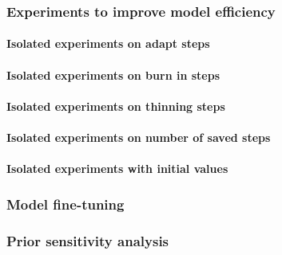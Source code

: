 \documentclass[12pt]{article}
\begin{document}
\hypertarget{experiments-to-improve-model-efficiency}{%
\subsubsection{Experiments to improve model
efficiency}\label{experiments-to-improve-model-efficiency}}

\hypertarget{isolated-experiments-on-adapt-steps}{%
\paragraph{Isolated experiments on adapt
steps}\label{isolated-experiments-on-adapt-steps}}

\hypertarget{isolated-experiments-on-burn-in-steps}{%
\paragraph{Isolated experiments on burn in
steps}\label{isolated-experiments-on-burn-in-steps}}

\hypertarget{isolated-experiments-on-thinning-steps}{%
\paragraph{Isolated experiments on thinning
steps}\label{isolated-experiments-on-thinning-steps}}

\hypertarget{isolated-experiments-on-number-of-saved-steps}{%
\paragraph{Isolated experiments on number of saved
steps}\label{isolated-experiments-on-number-of-saved-steps}}

\hypertarget{isolated-experiments-with-initial-values}{%
\paragraph{Isolated experiments with initial
values}\label{isolated-experiments-with-initial-values}}

\hypertarget{model-fine-tuning}{%
\subsubsection{Model fine-tuning}\label{model-fine-tuning}}

\hypertarget{prior-sensitivity-analysis}{%
\subsubsection{Prior sensitivity
analysis}\label{prior-sensitivity-analysis}}
\end{document}
